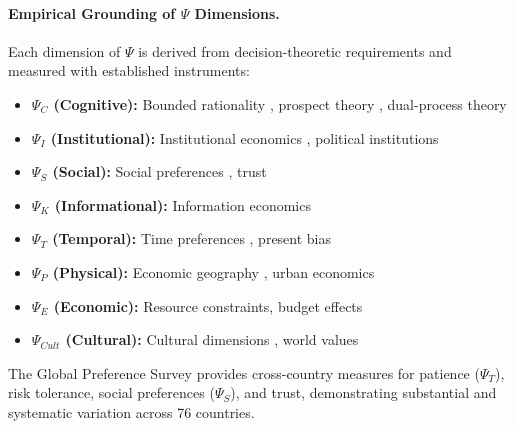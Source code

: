 
\paragraph{Empirical Grounding of $\Psi$ Dimensions.}
Each dimension of $\Psi$ is derived from decision-theoretic requirements and
measured with established instruments:

\begin{itemize}
  \item \textbf{$\Psi_C$ (Cognitive):} Bounded rationality \citep{simon1962},
        prospect theory \citep{kahnemantversky1979}, dual-process theory
        \citep{kahneman2011}
  \item \textbf{$\Psi_I$ (Institutional):} Institutional economics \citep{north1990institutions},
        political institutions \citep{acemoglurobinson2012}
  \item \textbf{$\Psi_S$ (Social):} Social preferences \citep{fehrcharness2024},
        trust \citep{knackkeefer1997}
  \item \textbf{$\Psi_K$ (Informational):} Information economics
        \citep{akerlof1970,stiglitz2000}
  \item \textbf{$\Psi_T$ (Temporal):} Time preferences \citep{frederick2002time},
        present bias \citep{laibson1997}
  \item \textbf{$\Psi_P$ (Physical):} Economic geography \citep{krugman1991},
        urban economics \citep{glaeser2008}
  \item \textbf{$\Psi_E$ (Economic):} Resource constraints, budget effects
  \item \textbf{$\Psi_{Cult}$ (Cultural):} Cultural dimensions \citep{hofstede1980},
        world values \citep{inglehart2014}
\end{itemize}

The Global Preference Survey \citep{falk2018} provides cross-country measures
for patience ($\Psi_T$), risk tolerance, social preferences ($\Psi_S$), and
trust, demonstrating substantial and systematic variation across 76 countries.


